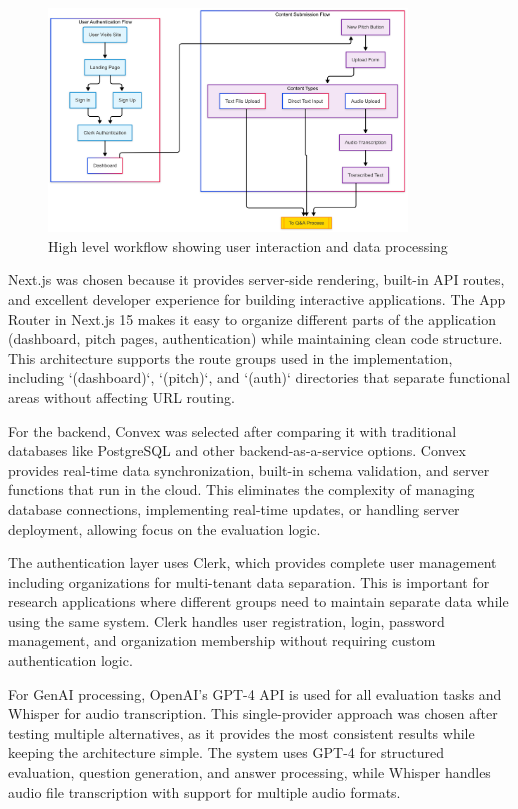 \begin{figure}[H]
  \centering
  \includegraphics[width=0.85\textwidth]{img/user-diagram-flow}
\caption{High level workflow showing user interaction and data processing}
  \label{fig:user-flow}
\end{figure}

Next.js was chosen because it provides server-side rendering, built-in API routes, and excellent developer experience for building interactive applications. The App Router in Next.js 15 makes it easy to organize different parts of the application (dashboard, pitch pages, authentication) while maintaining clean code structure. This architecture supports the route groups used in the implementation, including `(dashboard)`, `(pitch)`, and `(auth)` directories that separate functional areas without affecting URL routing.

For the backend, Convex was selected after comparing it with traditional databases like PostgreSQL and other backend-as-a-service options. Convex provides real-time data synchronization, built-in schema validation, and server functions that run in the cloud. This eliminates the complexity of managing database connections, implementing real-time updates, or handling server deployment, allowing focus on the evaluation logic.

The authentication layer uses Clerk, which provides complete user management including organizations for multi-tenant data separation. This is important for research applications where different groups need to maintain separate data while using the same system. Clerk handles user registration, login, password management, and organization membership without requiring custom authentication logic.

For GenAI processing, OpenAI's GPT-4 API is used for all evaluation tasks and Whisper for audio transcription. This single-provider approach was chosen after testing multiple alternatives, as it provides the most consistent results while keeping the architecture simple. The system uses GPT-4 for structured evaluation, question generation, and answer processing, while Whisper handles audio file transcription with support for multiple audio formats.

